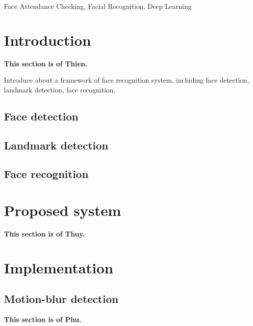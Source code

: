 \documentclass[journal, twocolumn]{IEEEtran}
\begin{document}
\begin{IEEEkeywords}
Face Attendance Checking, Facial Recognition, Deep Learning
\end{IEEEkeywords}


\IEEEpeerreviewmaketitle


\section{Introduction}
\label{introduction}
\textbf{This section is of Thien.}

Introduce about a framework of face recognition system, including face detection, landmark detection, face recognition.

\subsection{Face detection}

\subsection{Landmark detection}

\subsection{Face recognition}


\medskip
\section{Proposed system}
\label{proposed-system}
\textbf{This section is of Thuy.}


\medskip
\section{Implementation}
\label{implementation}

\subsection{Motion-blur detection}
\label{motion-blur-detection}
\textbf{This section is of Phu.}
\end{document}
